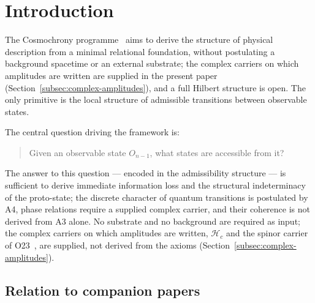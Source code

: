 \documentclass[11pt,a4paper]{article}
\begin{document}
    \clearpage
    \tableofcontents

    \clearpage

  \section{Introduction}
  \label{sec:intro}

  The Cosmochrony programme~\cite{Cosmochrony} aims to derive the structure of
  physical description from a minimal relational foundation, without postulating
  a background spacetime or an external substrate; the complex carriers on which amplitudes are written are
  supplied in the present paper (Section~\ref{subsec:complex-amplitudes}), and a full Hilbert structure is open.
  The only primitive is the local structure of admissible transitions between
  observable states.

  The central question driving the framework is:

  \begin{quote}
    Given an observable state $O_{n-1}$, what states are accessible from it?
  \end{quote}

  The answer to this question — encoded in the admissibility structure — is
  sufficient to derive immediate information loss and the structural indeterminacy of the proto-state; the
  discrete character of quantum transitions is postulated by A4, phase relations require a supplied complex
  carrier, and their coherence is not derived from A3 alone.
  No substrate and no background are required as input; the complex carriers on which amplitudes are
  written, $\mathcal{H}_c$ and the spinor carrier of O23~\cite{Beau2026a27}, are supplied, not derived from the axioms
  (Section~\ref{subsec:complex-amplitudes}).

  \subsection*{Relation to companion papers}
\end{document}
